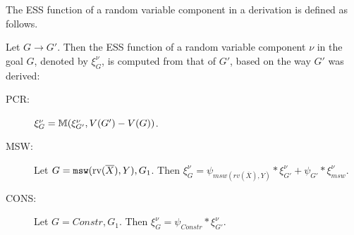 The ESS function of a random variable component in a derivation is defined as
follows.
\begin{Def}
 Let $G \rightarrow G'$.  Then the ESS function of a random variable component $\nu$ in the goal $G$, denoted by
 $\xi^{\nu}_G$, is computed from that of $G'$, based on the way $G'$ was derived:
\begin{description}
\item[PCR:] $\xi^{\nu}_G = \mathbb{M}(\xi^{\nu}_{G'}, V(G') - V(G))$.
\item[MSW:] Let $G= \mbox{\tt msw}(\mbox{\rm rv}(\overline{X}), Y), G_1$.
  Then $\xi^{\nu}_G = \psi_{msw(rv(\overline{X}),Y)} * \xi^{\nu}_{G'} + \psi_{G'} * \xi^{\nu}_{msw}$.
\item[CONS:] Let $G= Constr, G_1$.  Then
  $\xi_G^{\nu} = \psi_{Constr} * \xi^{\nu}_{G'}.$
\end{description}
\end{Def}


